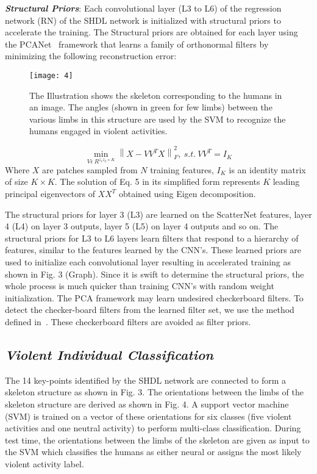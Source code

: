 \documentclass[10pt,twocolumn,letterpaper]{article}
\begin{document}
\textbf{\textit{Structural Priors}}: Each convolutional layer (L3 to L6) of the regression network (RN) of the SHDL network is initialized with structural priors to accelerate the training. The Structural priors are obtained for each layer using the PCANet~\cite{pcanet} framework that learns a family of orthonormal filters by minimizing the following reconstruction error:
\begin{figure}[t]
	\begin{center}
		\texttt{[image: 4]}
	\end{center}
	\caption{
		The Illustration shows the skeleton corresponding to the humans in an image. The angles (shown in green for few limbs) between the various limbs in this structure are used by the SVM to recognize the humans engaged in violent activities.}
	\label{fig:long}
	\label{fig:onecol}
\end{figure}
\begin{equation}
\min_{V \epsilon \ R^{z_{1}z_{2}\times K} } \left \|X-VV^TX  \right \|_{F}^2,\ s.t.\  VV^T = I_{K}
\end{equation} 
Where $X$ are patches sampled from $N$ training features, $I_K$ is an identity matrix of size $K \times K$. The solution of Eq. 5 in its simplified form represents $K$ leading principal eigenvectors of $XX^T$ obtained using Eigen decomposition.

The structural priors for layer 3 (L3) are learned on the ScatterNet features, layer 4 (L4) on layer 3 outputs, layer 5 (L5) on layer 4 outputs and so on. The structural priors for L3 to L6 layers learn filters that respond to a hierarchy of features, similar to the features learned by the CNN's. These learned priors are used to initialize each convolutional layer resulting in accelerated training as shown in Fig. 3 (Graph). Since it is swift to determine the structural priors, the whole process is much quicker than training CNN's with random weight initialization. The PCA framework may learn undesired checkerboard filters. To detect the checker-board filters from the learned filter set, we use the method defined in~\cite{geiger2012}. These checkerboard filters are avoided as filter priors. 

\subsection{\textbf{\textit{Violent Individual Classification}}}
The 14 key-points identified by the SHDL network are connected to form a skeleton structure as shown in Fig. 3. The orientations between the limbs of the skeleton structure are derived as shown in Fig. 4.  A support vector machine (SVM) is trained on a vector of these orientations for six classes (five violent activities and one neutral activity) to perform multi-class classification. During test time, the orientations between the limbs of the skeleton are given as input to the SVM which classifies the humans as either neural or assigns the most likely violent activity label.
\end{document}
